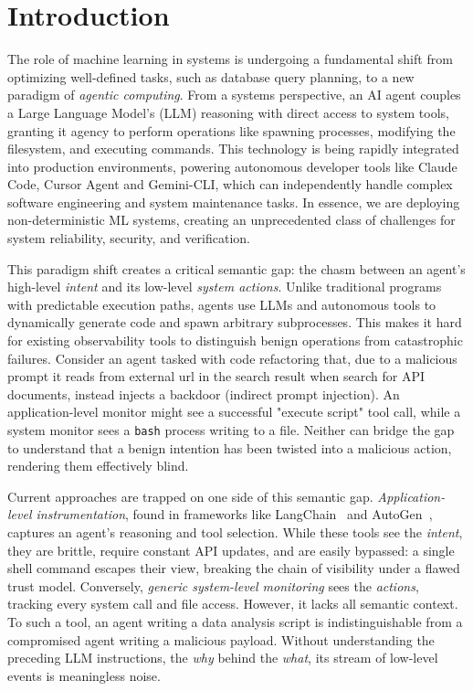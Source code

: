 \section{Introduction}

The role of machine learning in systems is undergoing a fundamental shift from optimizing well-defined tasks, such as database query planning, to a new paradigm of \emph{agentic computing}. From a systems perspective, an AI agent couples a Large Language Model's (LLM) reasoning with direct access to system tools, granting it agency to perform operations like spawning processes, modifying the filesystem, and executing commands. This technology is being rapidly integrated into production environments, powering autonomous developer tools like Claude Code\cite{claudecode}, Cursor Agent\cite{cursor} and Gemini-CLI\cite{geminicli}, which can independently handle complex software engineering and system maintenance tasks. In essence, we are deploying non-deterministic ML systems, creating an unprecedented class of challenges for system reliability, security, and verification.

This paradigm shift creates a critical semantic gap: the chasm between an agent's high-level \emph{intent} and its low-level \emph{system actions}. Unlike traditional programs with predictable execution paths, agents use LLMs and autonomous tools to dynamically generate code and spawn arbitrary subprocesses. This makes it hard for existing observability tools to distinguish benign operations from catastrophic failures. Consider an agent tasked with code refactoring that, due to a malicious prompt it reads from external url in the search result when search for API documents, instead injects a backdoor (indirect prompt injection)\cite{indirect-prompt-inject}. An application-level monitor might see a successful "execute script" tool call, while a system monitor sees a \texttt{bash} process writing to a file. Neither can bridge the gap to understand that a benign intention has been twisted into a malicious action, rendering them effectively blind.

Current approaches are trapped on one side of this semantic gap. \emph{Application-level instrumentation}, found in frameworks like LangChain~\cite{langchain} and AutoGen~\cite{autogen}, captures an agent's reasoning and tool selection. While these tools see the \emph{intent}, they are brittle, require constant API updates, and are easily bypassed: a single shell command escapes their view, breaking the chain of visibility under a flawed trust model. Conversely, \emph{generic system-level monitoring} sees the \emph{actions}, tracking every system call and file access. However, it lacks all semantic context. To such a tool, an agent writing a data analysis script is indistinguishable from a compromised agent writing a malicious payload. Without understanding the preceding LLM instructions, the \emph{why} behind the \emph{what}, its stream of low-level events is meaningless noise.


